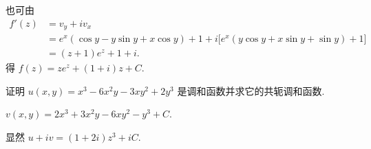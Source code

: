 也可由
\begin{align*}
	f'(z)&=v_y+iv_x\\
	&=e^x(\cos y-y\sin y+x\cos y)+1
	+i\bigl[e^x(y\cos y+x\sin y+\sin y)+1\bigr]\\
	&{=(z+1)e^z+1+i.}
\end{align*}
得 $f(z)=ze^z+(1+i)z+C$.
\begin{exercise}
	证明 $u(x,y)=x^3-6x^2y-3xy^2+2y^3$ 是调和函数并求它的共轭调和函数.
\end{exercise}

\begin{answer}
	$v(x,y)=2x^3+3x^2y-6xy^2-y^3+C$.
\end{answer}
显然 $u+iv=(1+2i)z^3+iC$.

